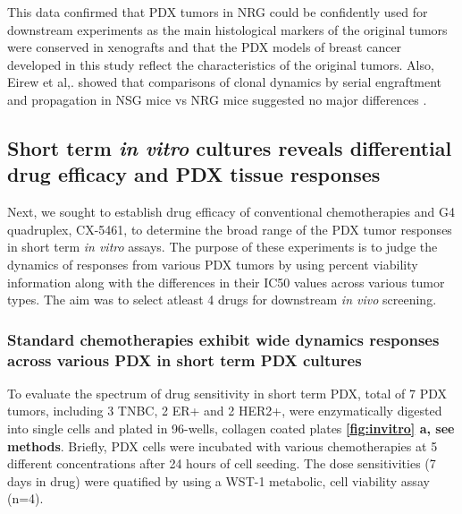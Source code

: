  This data confirmed that PDX tumors in \ac{NRG} could be confidently used for downstream experiments as the main histological markers of the original tumors were conserved in xenografts and that the PDX models of breast cancer developed in this study reflect the characteristics of the original tumors. Also, Eirew et al,. showed that comparisons of clonal dynamics by serial engraftment and propagation in NSG mice vs NRG mice suggested no major differences \cite{eirew2015dynamics}.



\subsection{Short term \textit {in vitro} cultures reveals differential drug efficacy and PDX tissue responses
}
Next, we sought to establish drug efficacy of conventional chemotherapies and G4 quadruplex, CX-5461, to determine the broad range of the PDX tumor responses in short term \textit{in vitro} assays. The purpose of these experiments is to judge the dynamics of responses from various PDX tumors by using percent viability information along with the differences in their IC50 values across various tumor types. 
The aim was to select atleast 4 drugs for downstream \textit{in vivo} screening.

\subsubsection{Standard chemotherapies exhibit wide dynamics responses across various PDX in short term PDX cultures}

To evaluate the spectrum of drug sensitivity in short term PDX,
total of 7 PDX tumors, including 3 TNBC, 2 ER+ and 2 HER2+, were enzymatically digested into single cells and plated in 96-wells, collagen coated plates \textbf{\autoref{fig:invitro} a, see methods}. 
Briefly, PDX cells were incubated with various chemotherapies at 5 different concentrations after 24 hours of cell seeding. The dose sensitivities (7 days in drug) were quatified by using a WST-1 metabolic, cell viability assay (n=4). 

